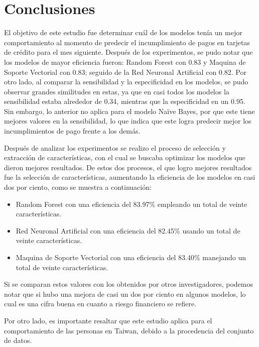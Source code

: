 \documentclass[conference]{IEEEtran}
\begin{document}
\section{Conclusiones}

El objetivo de este estudio fue determinar cuál de los modelos tenía un mejor comportamiento al momento de predecir el incumplimiento de pagos en tarjetas de crédito para el mes siguiente. Después de los experimentos, se pudo notar que los modelos de mayor eficiencia fueron: Random Forest con 0.83 y Maquina de Soporte Vectorial con 0.83;  seguido de la Red Neuronal Artificial con 0.82. Por otro lado, al comparar la sensibilidad y la especificidad en los modelos, se pudo observar grandes similitudes en estas, ya que en casi todos los modelos la sensibilidad estaba alrededor de 0.34, mientras que la especificidad en un 0.95. Sin embargo, lo anterior no aplica para el modelo Naïve Bayes, por que este tiene mejores valores en la sensibilidad,  lo que indica que este logra predecir mejor los incumplimientos de pago frente a los demás.

Después de analizar los experimentos se realizo el proceso de selección y extracción de características, con el cual se buscaba optimizar los modelos que dieron mejores resultados. De estos dos procesos, el que logro mejores resultados fue la selección de características, aumentando la eficiencia de los modelos en casi dos por ciento, como se muestra a continuación: 

\begin{itemize}
\item Random Forest con una eficiencia del 83.97\%  empleando un total de veinte características.
\item Red Neuronal Artificial con una eficiencia del 82.45\% usando un total de veinte características.
\item Maquina de Soporte Vectorial con una eficiencia del 83.40\% manejando un total de veinte características.
\end{itemize}

Si se comparan estos valores con los obtenidos por otros investigadores, podemos notar que si hubo una mejora de casi un dos por ciento en algunos modelos, lo cual es una cifra buena en cuanto a riesgo financiero se refiere.

Por otro lado, es importante resaltar que este estudio aplica para el comportamiento de las personas en Taiwan, debido a la procedencia del conjunto de datos.
\end{document}
